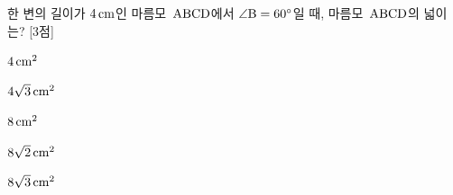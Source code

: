 한 변의 길이가 $4\mkern3mu \mathrm{cm}$인 마름모~$\mathrm{ABCD}$에서 $\angle\mathrm{B}=60^\circ$일 때, 마름모~$\mathrm{ABCD}$의 넓이는? \mbox{[3점]}
\begin{choices32}{\rule[-3ex]{0pt}{8ex}$4\mkern3mu \mathrm{cm}^2$}{\rule[-3ex]{0pt}{8ex}$4\sqrt{3}\mkern3mu \mathrm{cm}^2$}{\rule[-3ex]{0pt}{8ex}$8\mkern3mu \mathrm{cm}^2$}{\rule[-3ex]{0pt}{8ex}$8\sqrt{2}\mkern3mu \mathrm{cm}^2$}{\rule[-3ex]{0pt}{8ex}$8\sqrt{3}\mkern3mu \mathrm{cm}^2$}\end{choices32}
